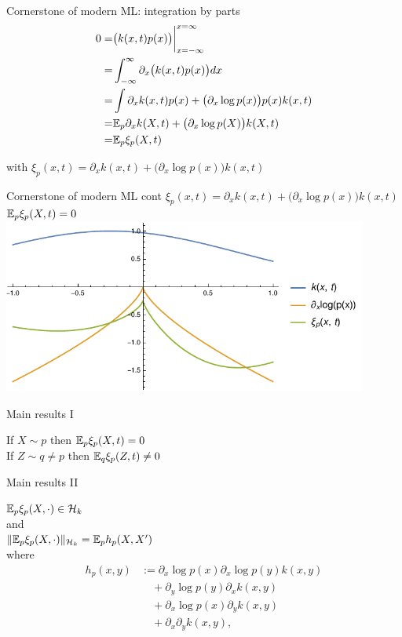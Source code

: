 \documentclass{beamer}
\begin{document}
  \begin{frame}{Cornerstone of modern ML: integration by parts}
\begin{align*}
 0= & \big( k(x,t) p(x) \big) \bigg |_{x=-\infty}^{x=\infty} \\
   = &  \int_{-\infty}^{\infty} \partial_{x} \big( k(x,t) p(x) \big)  dx \\
   = &  \int  \partial_{x} k(x,t) p(x)   + \big( \partial_{x} \log p(x) \big) p(x) k(x,t)  \\
   = &  \mathbb{E}_p \partial_{x} k(X,t)   + \big( \partial_{x} \log p(X) \big)  k(X,t)\\
   = & \mathbb{E}_p \xi_p(X,t)
\end{align*}

with $\xi_p(x,t) = \partial_{x} k(x,t)   + \big( \partial_{x} \log p(x) \big)  k(x,t)$
 \end{frame} 
  
 \begin{frame}{Cornerstone of modern ML cont}
$\xi_p(x,t) = \partial_{x} k(x,t)   + \big( \partial_{x} \log p(x) \big)  k(x,t)$ \\
$\mathbb{E}_p \xi_p(X,t)=0$
 \includegraphics[width=0.9\textwidth]{./img/xi.pdf} 
 \end{frame} 
 
\begin{frame}{Main results I}
\begin{center}
If $X \sim p$ then $\mathbb{E}_ p\xi_p(X,t)=0$
\\
\vspace{1cm}
If $Z \sim q \neq p$ then $\mathbb{E}_q \xi_p(Z,t) \neq 0$
\end{center}
\end{frame} 

\begin{frame}{Main results II}
\begin{center}
$\mathbb{E}_p \xi_p(X,\cdot)  \in \mathcal{H}_k$ \\ 
and \\
$\|\mathbb{E}_p \xi_p(X,\cdot) \|_{\mathcal{H}_k}  = \mathbb{E}_{p}h_p(X,X')$ \\
where 
\begin{align*}
h_{p}(x,y) & := \partial_{x} \log p(x) \partial_{x} \log p(y) k(x,y)\\
 & \quad+\partial_{y}\log p(y) \partial_{x}  k(x,y)\\
 & \quad+\partial_{x}\log p(x) \partial_{y}k(x,y)\\
 & \quad+\partial_{x} \partial_{y} k(x,y),
\end{align*}
\end{center}
\end{frame}
\end{document}
